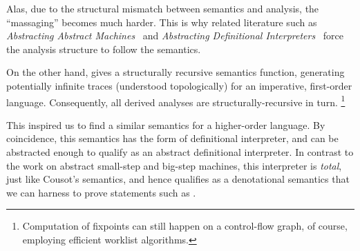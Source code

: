Alas, due to the structural mismatch between semantics and analysis, the
``massaging'' becomes much harder.
This is why related literature such as
\emph{Abstracting Abstract Machines}~\citep{aam} and
\emph{Abstracting Definitional Interpreters}~\citep{adi}
force the analysis structure to follow the semantics.

On the other hand, \citet{Cousot:21} gives a structurally recursive semantics
function, generating potentially infinite traces (understood topologically) for
an imperative, first-order language.
Consequently, all derived analyses are structurally-recursive in turn.%
\footnote{Computation of fixpoints can still happen on a control-flow graph, of
course, employing efficient worklist algorithms.}

This inspired us to find a similar semantics for a higher-order language.
By coincidence, this semantics has the form of definitional interpreter,
and can be abstracted enough to qualify as an abstract definitional interpreter.
In contrast to the work on abstract small-step and big-step
machines, this interpreter is \emph{total}, just like Cousot's semantics, and
hence qualifies as a denotational semantics that we can harness to prove
statements such as .



%
